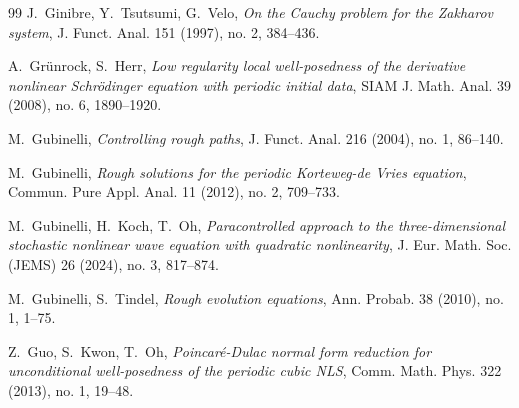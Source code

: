 \documentclass[letterpaper, 11pt,  reqno]{amsart}
\newcommand{\1}{\hspace{0.5mm}\text{I}\hspace{0.5mm}}
\numberwithin{equation}{section}
\numberwithin{theorem}{section}
\begin{document}
\begin{thebibliography}{99}
J.~Ginibre, Y.~Tsutsumi, G.~Velo, 
{\it On the Cauchy problem for the Zakharov system}, 
J. Funct. Anal. 151 (1997), no. 2, 384--436.

%
%



A.~Gr\"unrock, S.~Herr, 
{\it Low regularity local well-posedness of the derivative nonlinear Schr\"odinger equation with periodic initial data}, SIAM J. Math. Anal. 39 (2008), no. 6, 1890--1920.


M.~Gubinelli,
{\it Controlling rough paths},
J. Funct. Anal. 216 (2004), no. 1, 86--140.



M.~Gubinelli, 
{\it Rough solutions for the periodic Korteweg-de Vries equation},
Commun. Pure Appl. Anal. 11 (2012), no. 2, 709--733.






%
%
%

M.~Gubinelli, H.~Koch, T.~Oh, 
{\it  Paracontrolled approach to the three-dimensional stochastic nonlinear wave equation with quadratic nonlinearity},  
J. Eur. Math. Soc. (JEMS) 26 (2024), no. 3, 817--874. 



M.~Gubinelli, S.~Tindel,
{\it Rough evolution equations},
Ann. Probab. 38 (2010), no. 1, 1--75.




Z.~Guo, S.~Kwon, T.~Oh, 
{\it Poincar\'e-Dulac normal form reduction for unconditional well-posedness of
the periodic cubic NLS}, Comm. Math. Phys. 322 (2013), no. 1, 19--48.



\end{thebibliography}
\end{document}
